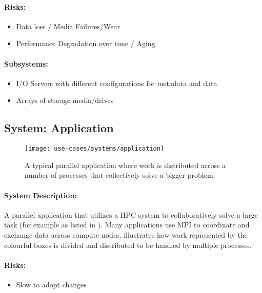 \paragraph{Risks:}
\begin{itemize}
	\item Data loss / Media Failures/Wear
	\item Performance Degradation over time / Aging
\end{itemize}


\paragraph{Subsystems:}

\begin{itemize}
	\item I/O Servers with different configurations for metadata and data
	\item Arrays of storage media/drives
\end{itemize}


\subsection{System: Application}
\label{System: Application}

\begin{figure}
	\centering
	\texttt{[image: use-cases/systems/application]}
	\caption{A typical parallel application where work is distributed across a number of processes that collectively solve a bigger problem.}
	\label{fig:System: Application}
\end{figure}

\paragraph{System Description:}
A parallel application that utilizes a HPC system to collaboratively solve a large task (for example as listed in ).
Many applications use MPI to coordinate and exchange data across compute nodes.
 illustrates how work represented by the colourful boxes is divided and distributed to be handled by multiple processes.

\paragraph{Risks:}
\begin{itemize}
	\item Slow to adopt changes
\end{itemize}


